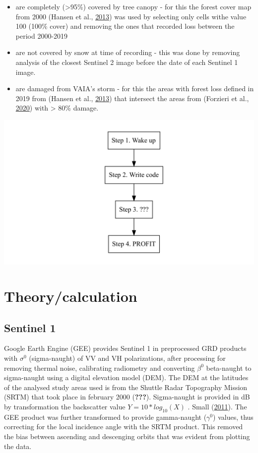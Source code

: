 \documentclass[]{elsarticle} %
\makeatletter
\def\maxwidth{\ifdim\Gin@nat@width>\linewidth\linewidth
\else\Gin@nat@width\fi}
\let\Oldincludegraphics\includegraphics
\renewcommand{\includegraphics}[1]{\Oldincludegraphics[width=\maxwidth]{#1}}
\makeatother
\begin{document}
\begin{itemize}
\item
  are completely (\textgreater{}95\%) covered by tree canopy - for this
  the forest cover map from 2000 (Hansen et al.,
  \protect\hyperlink{ref-Hansen2013}{2013}) was used by selecting only
  cells withe value 100 (100\% cover) and removing the ones that
  recorded loss between the period 2000-2019
\item
  are not covered by snow at time of recording - this was done by
  removing analysis of the closest Sentinel 2 image before the date of
  each Sentinel 1 image.
\item
  are damaged from VAIA's storm - for this the areas with forest loss
  defined in 2019 from (Hansen et al.,
  \protect\hyperlink{ref-Hansen2013}{2013}) that intersect the areas
  from (Forzieri et al., \protect\hyperlink{ref-Forzieri2020}{2020})
  with \textgreater{} 80\% damage.
\end{itemize}

\includegraphics{paper2_files/figure-latex/unnamed-chunk-1-1.pdf}

\hypertarget{theorycalculation}{%
\section{Theory/calculation}\label{theorycalculation}}

\hypertarget{sentinel-1}{%
\subsection{Sentinel 1}\label{sentinel-1}}

Google Earth Engine (GEE) provides Sentinel 1 in preprocessed GRD
products with \(\sigma^0\) (sigma-naught) of VV and VH polarizations,
after processing for removing thermal noise, calibrating radiometry and
converting \(\beta^0\) beta-naught to sigma-naught using a digital
elevation model (DEM). The DEM at the latitudes of the analysed study
areas used is from the Shuttle Radar Topography Mission (SRTM) that took
place in february 2000 ({\textbf{???}}). Sigma-naught is provided in dB
by transformation the backscatter value \(Y=10*log_{10}(X)\) . Small
(\protect\hyperlink{ref-Small2011}{2011}). The GEE product was further
transformed to provide gamma-naught (\(\gamma^0\)) values, thus
correcting for the local incidence angle with the SRTM product. This
removed the bias between ascending and descenging orbits that was
evident from plotting the data.
\end{document}
